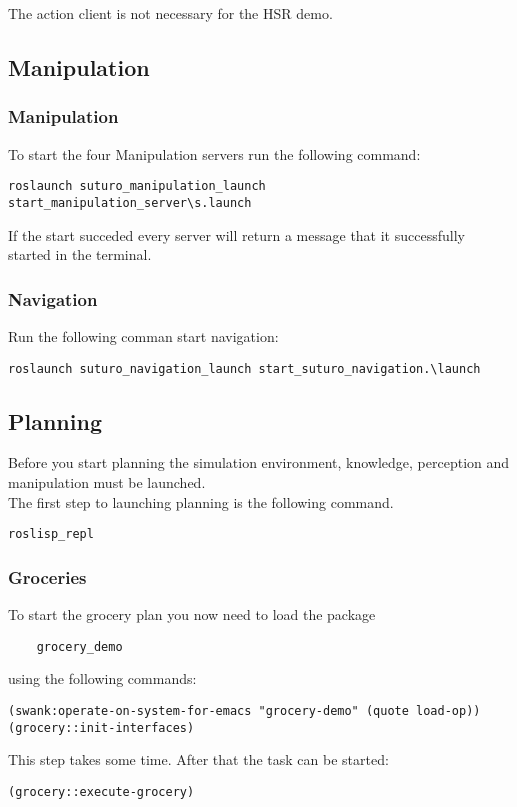 \documentclass[main.tex]{subfiles}
\begin{document}
The action client is not necessary for the HSR demo.
	
	\subsection{Manipulation}
	\subsubsection{Manipulation}
	To start the four Manipulation servers run the following command:
	\begin{lstlisting}
roslaunch suturo_manipulation_launch start_manipulation_server\s.launch
\end{lstlisting}
	If the start succeded every server will return a message that it successfully started in the terminal.	
	
	\subsubsection{Navigation}
	Run the following comman start navigation:
	\begin{lstlisting}
roslaunch suturo_navigation_launch start_suturo_navigation.\launch
\end{lstlisting}
	
	\subsection{Planning}
	Before you start planning the simulation environment, knowledge, perception and manipulation must be launched.\\
	The first step to launching planning is the following command.
	\begin{lstlisting}
roslisp_repl
\end{lstlisting}

	\subsubsection{Groceries}
	To start the grocery plan you now need to load the package \begin{verbatim}
	grocery_demo
	\end{verbatim}
	 using the following commands:
	\begin{lstlisting}
(swank:operate-on-system-for-emacs "grocery-demo" (quote load-op))
(grocery::init-interfaces)
\end{lstlisting}
This step takes some time. After that the task can be started:
\begin{lstlisting}
(grocery::execute-grocery)
\end{lstlisting}
\end{document}
